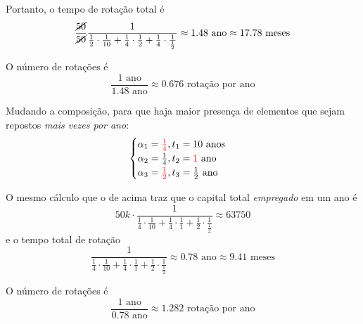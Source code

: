\documentclass[12pt]{article}
\numberwithin{equation}{section}
\theoremstyle{plain}
\theoremstyle{definition}
\theoremstyle{remark}
\begin{document}
Portanto, o tempo de rotação total é
$$
\frac{\cancel{ 50 }}{\cancel{ 50 }} \frac{1}{\frac{1}{2}\cdot \frac{1}{10} + \frac{1}{4} \cdot \frac{1}{2} + \frac{1}{4} \cdot \frac{1}{\frac{1}{2}}} \approx 1.48 \text{ ano} \approx 17.78 \text{ meses}
$$

O número de rotações é
$$
\frac{1 \text{ ano}}{1.48 \text{ ano}} \approx 0.676 \text{ rotação por ano}
$$

Mudando a composição, para que haja maior presença de elementos que sejam repostos \textit{mais vezes por ano}:
$$
\begin{cases}
\alpha_{1}={\color{red} \frac{1}{4}}, t_{1}=10 \text{ anos} \\
\alpha_{2}=\frac{1}{4}, t_{2}={\color{red} 1} \text{ ano}\\
\alpha_{3}={\color{red} \frac{1}{2}}, t_{3}=\frac{1}{2} \text{ ano}
\end{cases}
$$

O mesmo cálculo que o de acima traz que o capital total \textit{empregado} em um ano é
$$
50k \cdot \frac{1}{\frac{1}{4}\cdot \frac{1}{10} + \frac{1}{4} \cdot \frac{1}{1} + \frac{1}{2} \cdot \frac{1}{\frac{1}{2}}} \approx 63750
$$
e o tempo total de rotação
$$
\frac{1}{\frac{1}{4}\cdot \frac{1}{10} + \frac{1}{4} \cdot \frac{1}{1} + \frac{1}{2} \cdot \frac{1}{\frac{1}{2}}} \approx 0.78 \text{ ano} \approx 9.41 \text{ meses}
$$

O número de rotações é 
$$
\frac{1 \text{ ano}}{0.78 \text{ ano}} \approx 1.282 \text{ rotação por ano}
$$

\printbibliography
\end{document}

